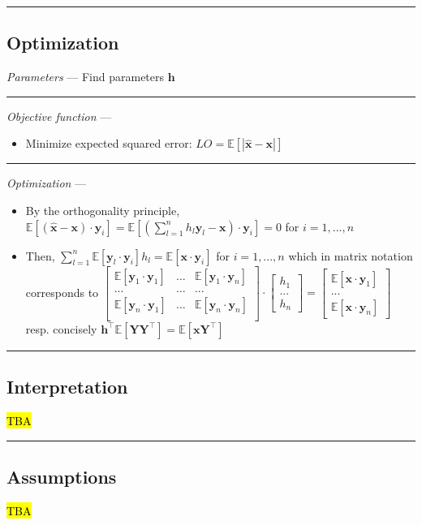 {\color{black}\hrule height 0.001mm}

\subsection*{Optimization}
\emph{Parameters} --- Find parameters $\boldsymbol{h}$

{\color{lightgray}\hrule height 0.001mm}

\emph{Objective function} --- 
\begin{itemize}
    \item Minimize expected squared error: $LO = \mathbb{E}[ | \hat{\boldsymbol{x}} - \boldsymbol{x} | ]$
\end{itemize}

{\color{lightgray}\hrule height 0.001mm}

\emph{Optimization} ---
\begin{itemize}
    \item By the orthogonality principle, $\mathbb{E} [ ( \hat{\boldsymbol{x}} - \boldsymbol{x} ) \cdot \boldsymbol{y}_i ] = \mathbb{E} [ ( \sum_{l=1}^n h_l \boldsymbol{y}_l - \boldsymbol{x} ) \cdot \boldsymbol{y}_i ] = 0$ for $i = 1, ..., n$
    \item Then, $\sum_{l=1}^n \mathbb{E}[ \boldsymbol{y}_l \cdot \boldsymbol{y}_i ] h_l = \mathbb{E}[ \boldsymbol{x} \cdot \boldsymbol{y}_i ]$ for $i = 1, ..., n$ which in matrix notation corresponds to
    $\begin{bmatrix}
    \mathbb{E}[\boldsymbol{y}_1 \cdot \boldsymbol{y}_1] & ... & \mathbb{E}[\boldsymbol{y}_1 \cdot \boldsymbol{y}_n]\\
    ... & ... & ...\\
    \mathbb{E}[\boldsymbol{y}_n \cdot \boldsymbol{y}_1] & ... & \mathbb{E}[\boldsymbol{y}_n \cdot \boldsymbol{y}_n]\\
    \end{bmatrix} \cdot 
    \begin{bmatrix}
    h_1 \\
    ... \\
    h_n
    \end{bmatrix} = 
    \begin{bmatrix}
    \mathbb{E}[\boldsymbol{x} \cdot \boldsymbol{y}_1]\\
    ...\\
    \mathbb{E}[\boldsymbol{x} \cdot \boldsymbol{y}_n]
    \end{bmatrix}$
    resp. concisely
    $\boldsymbol{h}^\intercal \mathbb{E}[ \boldsymbol{Y} \boldsymbol{Y}^\intercal ] = \mathbb{E}[\boldsymbol{x}  \boldsymbol{Y}^\intercal]$
\end{itemize}

{\color{black}\hrule height 0.001mm}

\subsection*{Interpretation}
\hl{TBA}

{\color{black}\hrule height 0.001mm}

\subsection*{Assumptions}
\hl{TBA}